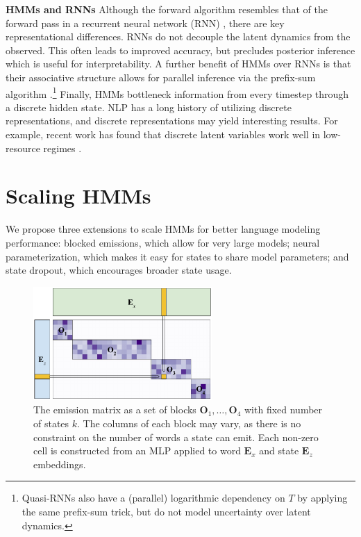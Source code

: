 \documentclass[11pt,a4paper]{article}
\begin{document}
\noindent \textbf{HMMs and RNNs}
Although the forward algorithm resembles that of the forward pass in a recurrent neural network (RNN)
\citep{buys2018hmm}, there are key representational differences.
RNNs do not decouple the latent dynamics from the observed.
This often leads to improved accuracy,
but precludes posterior inference which is useful for interpretability.
A further benefit of HMMs over RNNs is that
their associative structure allows for parallel inference
via the prefix-sum algorithm \cite{ladner1980prefix}.\footnote{
Quasi-RNNs \citep{bradbury2016qrnn} also have a (parallel) logarithmic dependency on $T$
by applying the same prefix-sum trick, but do not model uncertainty over
latent dynamics.}
Finally, HMMs bottleneck information from every timestep through a discrete hidden state. 
NLP has a long history of utilizing discrete representations,
and discrete representations may yield interesting results.
For example, recent work has found that discrete latent variables
work well in low-resource regimes \citep{jin2020discrete}.

\section{Scaling HMMs}
\label{sec:methods}

We propose three extensions to scale HMMs for better language modeling performance:
blocked emissions, which allow for very large models;
neural parameterization, which makes it easy for states to share model parameters;
and state dropout, which encourages broader state usage. 

\begin{figure}[t]
\centering
\includegraphics[height=1.7in]{img/blocksparse_mat_no_block.pdf}
\caption{\label{fig:emit}
The emission matrix as a set of blocks $\mathbf{O}_1, \ldots, \mathbf{O}_4$
with fixed number of states $k$.
The columns of each block may vary, as there is no constraint on the number of words
a state can emit.
Each non-zero cell is constructed from an MLP applied to word $\mathbf{E}_x$
and state $\mathbf{E}_z$ embeddings.
}
\end{figure}
\end{document}
